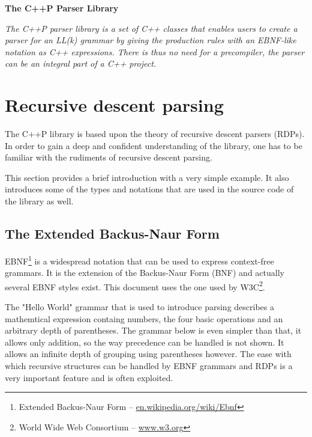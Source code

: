 \documentclass[12pt]{article}
\begin{document}
\sloppy

\vspace*{2em}
\centerline{\Huge\textbf{The C++P Parser Library}}
\vspace{5em}

\begin{center}
	\begin{minipage}[h]{0.85\linewidth}
		\itshape
		The C++P parser library is a set of C++ classes that enables users to create a parser for an
		LL(k) grammar by giving the production rules with an EBNF-like notation as C++ expressions. There is
		thus no need for a precompiler, the parser can be an integral part of a C++ project.
	\end{minipage}
\end{center}

\vspace{4.5em}

\section*{Recursive descent parsing}
The C++P library is based upon the theory of recursive descent parsers (RDPs). In order to gain a deep and confident
understanding of the library, one has to be familiar with the rudiments of recursive descent parsing.

This section provides a brief introduction with a very simple example. It also introduces some of the types
and notations that are used in the source code of the library as well.

\subsection*{The Extended Backus-Naur Form}
EBNF\footnote{Extended Backus-Naur Form --
\href{http://en.wikipedia.org/wiki/Ebnf}{en.wikipedia.org/wiki/Ebnf}} is a widespread notation that can be
used to express context-free grammars. It is the extension of the Backus-Naur Form (BNF) and actually several
EBNF styles exist. This document uses the one used by W3C\footnote{World Wide Web Consortium --
\href{http://www.w3.org}{www.w3.org}}.

The "Hello World" grammar that is used to introduce parsing describes a mathemtical expression containg
numbers, the four basic operations and an arbitrary depth of parentheses. The grammar below is even simpler
than that, it allows only addition, so the way precedence can be handled is not shown. It allows an infinite
depth of grouping using parentheses however. The ease with which recursive structures can be handled by
EBNF grammars and RDPs is a very important feature and is often exploited.
\end{document}
